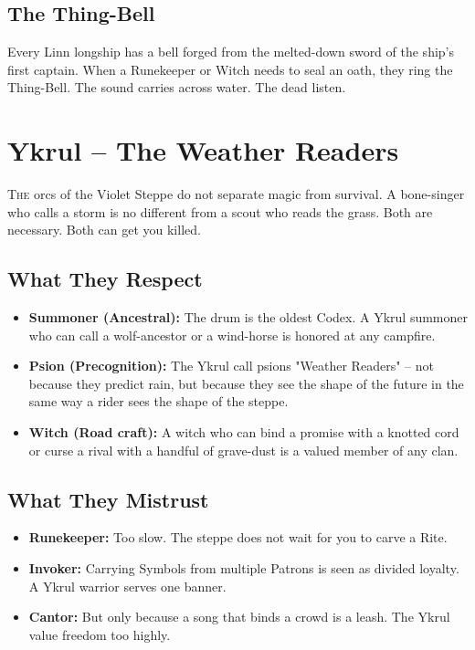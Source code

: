 \documentclass[10pt,a5paper]{book}
\begin{document}
\subsection*{The Thing-Bell}
Every Linn longship has a bell forged from the melted-down sword of the ship's first captain. When a Runekeeper or Witch needs to seal an oath, they ring the Thing-Bell. The sound carries across water. The dead listen.

\section{Ykrul -- The Weather Readers}

\lettrine{T}{he} orcs of the Violet Steppe do not separate magic from survival. A bone-singer who calls a storm is no different from a scout who reads the grass. Both are necessary. Both can get you killed.

\subsection*{What They Respect}
\begin{itemize}
    \item \textbf{Summoner (Ancestral):} The drum is the oldest Codex. A Ykrul summoner who can call a wolf-ancestor or a wind-horse is honored at any campfire.
    \item \textbf{Psion (Precognition):} The Ykrul call psions "Weather Readers" -- not because they predict rain, but because they see the shape of the future in the same way a rider sees the shape of the steppe.
    \item \textbf{Witch (Road craft):} A witch who can bind a promise with a knotted cord or curse a rival with a handful of grave-dust is a valued member of any clan.
\end{itemize}

\subsection*{What They Mistrust}
\begin{itemize}
    \item \textbf{Runekeeper:} Too slow. The steppe does not wait for you to carve a Rite.
    \item \textbf{Invoker:} Carrying Symbols from multiple Patrons is seen as divided loyalty. A Ykrul warrior serves one banner.
    \item \textbf{Cantor:} But only because a song that binds a crowd is a leash. The Ykrul value freedom too highly.
\end{itemize}
\end{document}
